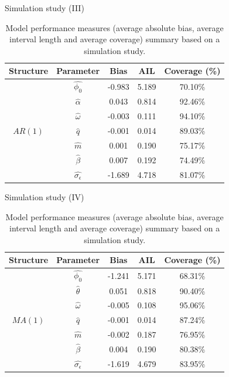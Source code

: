 \documentclass[
    10pt,
    aspectratio=169,
    usenames,
    dvipsnames
]{beamer}
\begin{document}
\begin{frame}{Simulation study (III)}
  \begin{table}
    \caption{Model performance measures (average absolute bias, average interval length and average coverage) summary based on a simulation study.}
    \begin{tabular}{ccccc}
\toprule
\textbf{Structure} & \textbf{Parameter} & \textbf{Bias} & \textbf{AIL} & \textbf{Coverage (\%)}\\
\midrule
\multirow{7}{*}{$AR(1)$}      & $\hat{\phi_0}$            &-0.983 & 5.189 & 70.10\% \\
                              & $\hat{\alpha}$            & 0.043 & 0.814 & 92.46\% \\
                              & $\hat{\omega}$            &-0.003 & 0.111 & 94.10\% \\
                              & $\hat{q}$                 &-0.001 & 0.014 & 89.03\% \\
                              & $\hat{m}$                 & 0.001 & 0.190 & 75.17\% \\
                              & $\hat{\beta}$             & 0.007 & 0.192 & 74.49\% \\
                              & $\hat{\sigma_{\epsilon}}$ &-1.689 & 4.718 & 81.07\% \\
\bottomrule
\end{tabular}
  \end{table}
\end{frame}

\begin{frame}{Simulation study (IV)}
  \begin{table}
    \caption{Model performance measures (average absolute bias, average interval length and average coverage) summary based on a simulation study.}
    \begin{tabular}{ccccc}
\toprule
\textbf{Structure} & \textbf{Parameter} & \textbf{Bias} & \textbf{AIL} & \textbf{Coverage (\%)}\\
\midrule
\multirow{7}{*}{$MA(1)$}      & $\hat{\phi_0}$            &-1.241 & 5.171 & 68.31\% \\
                              & $\hat{\theta}$            & 0.051 & 0.818 & 90.40\% \\
                              & $\hat{\omega}$            &-0.005 & 0.108 & 95.06\% \\
                              & $\hat{q}$                 &-0.001 & 0.014 & 87.24\% \\
                              & $\hat{m}$                 &-0.002 & 0.187 & 76.95\% \\
                              & $\hat{\beta}$             & 0.004 & 0.190 & 80.38\% \\
                              & $\hat{\sigma_{\epsilon}}$ &-1.619 & 4.679 & 83.95\% \\
\bottomrule
\end{tabular}
  \end{table}
\end{frame}
\end{document}
